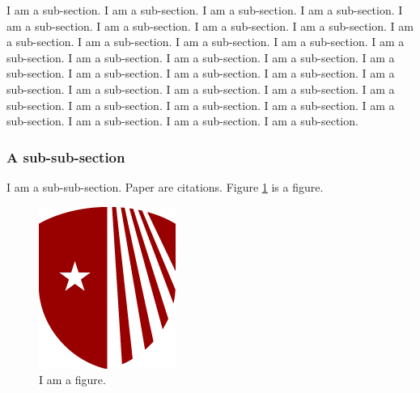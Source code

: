I am a sub-section. I am a sub-section. I am a sub-section. I am a sub-section. I am a sub-section. I am a sub-section. I am a sub-section. I am a sub-section. I am a sub-section. I am a sub-section. I am a sub-section. I am a sub-section. I am a sub-section. I am a sub-section. I am a sub-section. I am a sub-section. I am a sub-section. I am a sub-section. I am a sub-section. I am a sub-section. I am a sub-section. I am a sub-section. I am a sub-section. I am a sub-section. I am a sub-section. I am a sub-section. I am a sub-section. I am a sub-section. I am a sub-section. I am a sub-section. I am a sub-section. I am a sub-section. 

\subsubsection{A sub-sub-section}

I am a sub-sub-section. Paper \cite{human2001paper, human2002paper} are citations. Figure \ref{fig: my figure} is a figure.

\begin{figure}[h]
    \centering
    \includegraphics[scale=0.70]{Figures/stony-brook-university-logo.png}
    \caption{I am a figure.} 
    \label{fig: my figure}
\end{figure}

